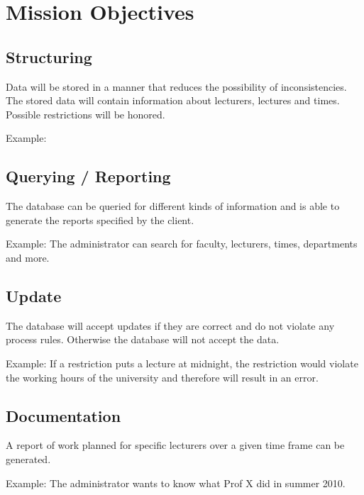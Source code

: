 \section{Mission Objectives}
\subsection{Structuring}

Data will be stored in a manner that reduces the possibility of
inconsistencies. The stored data will contain information about lecturers,
lectures and times. Possible restrictions will be honored.

Example: %

\subsection{Querying / Reporting}

The database can be queried for different kinds of information and is able to
generate the reports specified by the client.

Example: The administrator can search for faculty, lecturers, times,
departments and more.

\subsection{Update}

The database will accept updates if they are correct and do not violate any
process rules. Otherwise the database will not accept the data.

Example: If a restriction puts a lecture at midnight, the restriction would
violate the working hours of the university and therefore will result in an
error.

\subsection{Documentation}

A report of work planned for specific lecturers over a given time frame can be
generated.

Example: The administrator wants to know what Prof X did in summer 2010.

